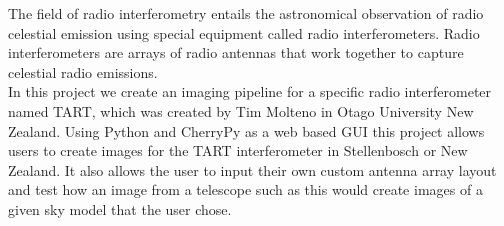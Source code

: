 The field of radio interferometry entails the astronomical observation of radio celestial emission using special equipment called radio interferometers. Radio interferometers are arrays of radio antennas that work together to capture celestial radio emissions\cite{DefinitionInterferometer}\cite{DefinitionInterferometer2}. \\
In this project we create an imaging pipeline for a specific radio interferometer named TART, which was created by Tim Molteno in Otago University New Zealand. Using Python and CherryPy\cite{Cherrypy} as a web based GUI this project allows users to create images for the TART interferometer in Stellenbosch or New Zealand. It also allows the user to input their own custom antenna array layout and test how an image from a telescope such as this would create images of a given sky model that the user chose.